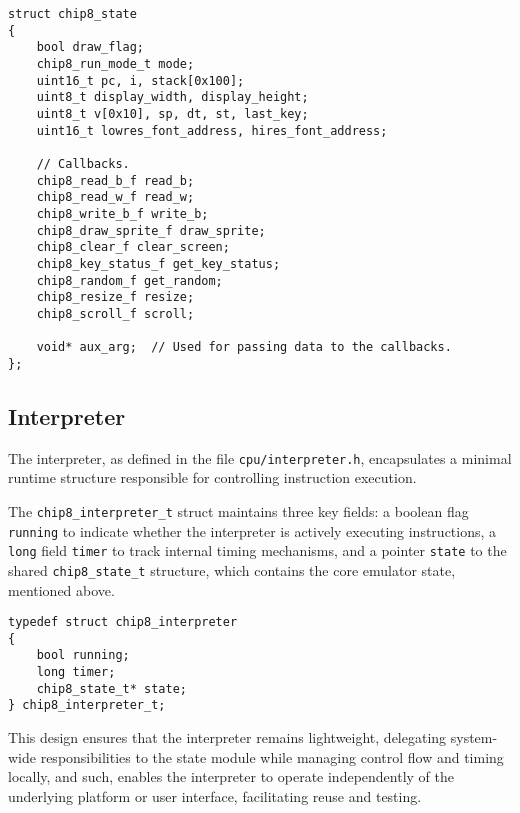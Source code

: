 \begin{verbatim}
struct chip8_state
{
    bool draw_flag;
    chip8_run_mode_t mode;
    uint16_t pc, i, stack[0x100];
    uint8_t display_width, display_height;
    uint8_t v[0x10], sp, dt, st, last_key;
    uint16_t lowres_font_address, hires_font_address;
    
    // Callbacks.
    chip8_read_b_f read_b;
    chip8_read_w_f read_w;
    chip8_write_b_f write_b;
    chip8_draw_sprite_f draw_sprite;
    chip8_clear_f clear_screen;
    chip8_key_status_f get_key_status;
    chip8_random_f get_random;
    chip8_resize_f resize;
    chip8_scroll_f scroll;
    
    void* aux_arg;  // Used for passing data to the callbacks.
};
\end{verbatim}

\subsection{Interpreter}
\label{subsec:ch3sec3sub1}

\par The interpreter, as defined in the file \texttt{cpu/interpreter.h}, encapsulates a minimal runtime structure responsible for controlling instruction execution.

\par The \texttt{chip8\_interpreter\_t} struct maintains three key fields: a boolean flag \texttt{running} to indicate whether the interpreter is actively executing instructions, a \texttt{long} field \texttt{timer} to track internal timing mechanisms, and a pointer \texttt{state} to the shared \texttt{chip8\_state\_t} structure, which contains the core emulator state, mentioned above.

\begin{verbatim}
typedef struct chip8_interpreter
{
    bool running;
    long timer;
    chip8_state_t* state;
} chip8_interpreter_t;
\end{verbatim}

\par This design ensures that the interpreter remains lightweight, delegating system-wide responsibilities to the state module while managing control flow and timing locally, and such, enables the interpreter to operate independently of the underlying platform or user interface, facilitating reuse and testing.

